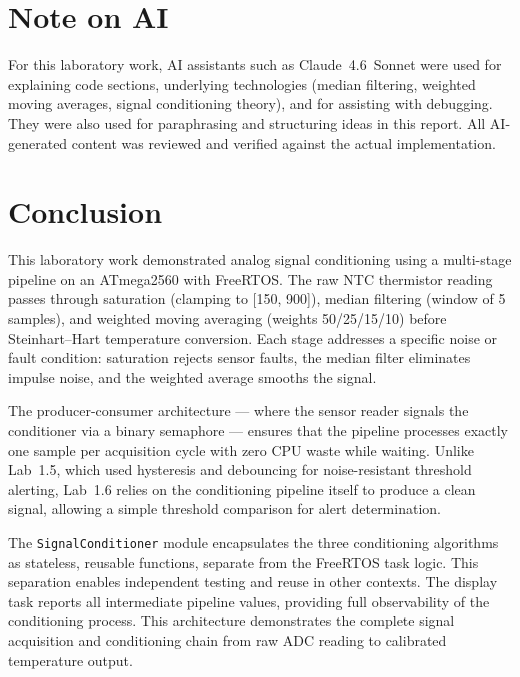 \documentclass[12pt]{article}
\begin{document}
\section{Note on AI}

\hspace{0.8cm}
For this laboratory work, AI assistants such as Claude~4.6~Sonnet were used for explaining code sections, underlying technologies (median filtering, weighted moving averages, signal conditioning theory), and for assisting with debugging. They were also used for paraphrasing and structuring ideas in this report. All AI-generated content was reviewed and verified against the actual implementation.

\section{Conclusion}

\hspace{0.8cm}
This laboratory work demonstrated analog signal conditioning using a multi-stage pipeline on an ATmega2560 with FreeRTOS. The raw NTC thermistor reading passes through saturation (clamping to [150, 900]), median filtering (window of 5 samples), and weighted moving averaging (weights 50/25/15/10) before Steinhart--Hart temperature conversion. Each stage addresses a specific noise or fault condition: saturation rejects sensor faults, the median filter eliminates impulse noise, and the weighted average smooths the signal.

\hspace{0.8cm}
The producer-consumer architecture --- where the sensor reader signals the conditioner via a binary semaphore --- ensures that the pipeline processes exactly one sample per acquisition cycle with zero CPU waste while waiting. Unlike Lab~1.5, which used hysteresis and debouncing for noise-resistant threshold alerting, Lab~1.6 relies on the conditioning pipeline itself to produce a clean signal, allowing a simple threshold comparison for alert determination.

\hspace{0.8cm}
The \texttt{SignalConditioner} module encapsulates the three conditioning algorithms as stateless, reusable functions, separate from the FreeRTOS task logic. This separation enables independent testing and reuse in other contexts. The display task reports all intermediate pipeline values, providing full observability of the conditioning process. This architecture demonstrates the complete signal acquisition and conditioning chain from raw ADC reading to calibrated temperature output.
\end{document}
